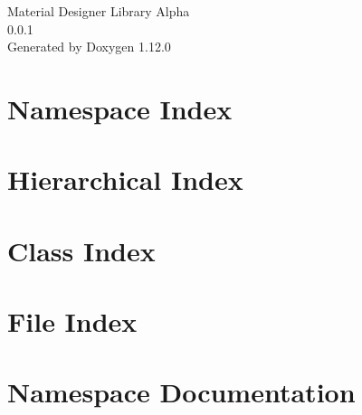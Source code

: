 \documentclass[twoside]{book}
\newcommand{\+}{\discretionary{\mbox{\scriptsize$\hookleftarrow$}}{}{}}
\newcommand{\clearemptydoublepage}{%
    \newpage{\pagestyle{empty}\cleardoublepage}%
  }
\begin{document}
  \raggedbottom
    \hypersetup{pageanchor=false,
                bookmarksnumbered=true,
                pdfencoding=unicode
               }
  \begin{titlepage}
  \vspace*{7cm}
  \begin{center}%
  {\Large Material Designer Library Alpha}\\
  [1ex]\large 0.\+0.\+1 \\
  \vspace*{1cm}
  {\large Generated by Doxygen 1.12.0}\\
  \end{center}
  \end{titlepage}
  \clearemptydoublepage
  \tableofcontents
  \clearemptydoublepage
  \hypersetup{pageanchor=true}

\chapter{Namespace Index}

\chapter{Hierarchical Index}

\chapter{Class Index}

\chapter{File Index}

\chapter{Namespace Documentation}

\end{document}
